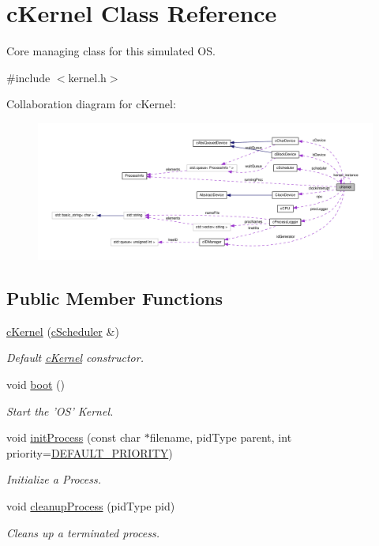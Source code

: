 \hypertarget{classcKernel}{\section{c\-Kernel \-Class \-Reference}
\label{db/da5/classcKernel}
}


\-Core managing class for this simulated \-O\-S.  




{\ttfamily \#include $<$kernel.\-h$>$}



\-Collaboration diagram for c\-Kernel\-:\nopagebreak
\begin{figure}[H]
\begin{center}
\leavevmode
\includegraphics[width=350pt]{d4/d6f/classcKernel__coll__graph}
\end{center}
\end{figure}
\subsection*{\-Public \-Member \-Functions}
\begin{DoxyCompactItemize}
\item 
\hyperlink{classcKernel_ab14dbe0cc2a6e4a346a38e24566fbdd1}{c\-Kernel} (\hyperlink{classcScheduler}{c\-Scheduler} \&)
\begin{DoxyCompactList}\small\item\em \-Default \hyperlink{classcKernel}{c\-Kernel} constructor. \end{DoxyCompactList}\item 
void \hyperlink{classcKernel_a0ce9a2721bb1ea4d7f999198634f702d}{boot} ()
\begin{DoxyCompactList}\small\item\em \-Start the '\-O\-S' \-Kernel. \end{DoxyCompactList}\item 
void \hyperlink{classcKernel_a5440eace2647ffd5279de55600947b84}{init\-Process} (const char $\ast$filename, pid\-Type parent, int priority=\hyperlink{kernel_8h_a0756f011ef667460d583017366823244}{\-D\-E\-F\-A\-U\-L\-T\-\_\-\-P\-R\-I\-O\-R\-I\-T\-Y})
\begin{DoxyCompactList}\small\item\em \-Initialize a \-Process. \end{DoxyCompactList}\item 
void \hyperlink{classcKernel_a1e7cb5c6d9e6140e197f9b18dc8bd1b1}{cleanup\-Process} (pid\-Type pid)
\begin{DoxyCompactList}\small\item\em \-Cleans up a terminated process. \end{DoxyCompactList}\end{DoxyCompactItemize}
